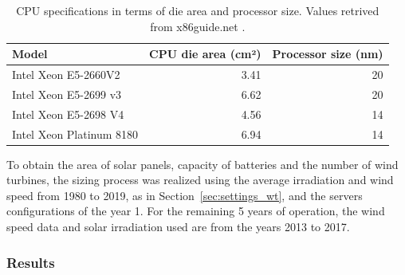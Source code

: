 \begin{table}[h]
  \small
  \caption{CPU specifications in terms of die area and processor size. Values retrived from x86guide.net \cite{ref_xeon_e5_2660v2,ref_xeon_e5_2698v4,ref_xeon_e5_2699v3,ref_xeon_platinum_8180}.} \centering
  \label{tab:cpu_specs} 
  \begin{tabular}{|l|r|r|}
   \hline

  \textbf{Model}  & \textbf{CPU die area (cm²)} & \textbf{Processor size (nm) } \\
    \hline
    Intel Xeon E5-2660V2 & 3.41  & 20  \\
    \hline
    Intel Xeon E5-2699 v3& 6.62  & 20  \\
    \hline
    Intel Xeon E5-2698 V4 & 4.56 & 14\\
    \hline
    Intel Xeon Platinum 8180 & 6.94 & 14\\
  \hline
\end{tabular}  
\end{table}

To obtain the area of solar panels, capacity of batteries and the number of wind turbines, the sizing process was realized using the average irradiation and wind speed from 1980 to 2019, as in Section~\ref{sec:settings_wt}, and the servers configurations of the year 1. For the remaining 5 years of operation, the wind speed data and solar irradiation used are from the years 2013 to 2017.

\subsubsection{Results}

